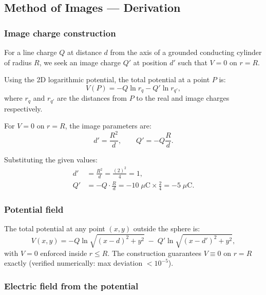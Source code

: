 \documentclass[11pt,a4paper]{article}
\begin{document}
\subsection{Method of Images --- Derivation}

\subsubsection{Image charge construction}

For a line charge $Q$ at distance $d$ from the axis of a grounded conducting cylinder of radius $R$, we seek an image charge $Q'$ at position $d'$ such that $V=0$ on $r=R$.

Using the 2D logarithmic potential, the total potential at a point $P$ is:
\begin{equation}
V(P) = -Q \ln r_q - Q' \ln r_{q'},
\end{equation}
where $r_q$ and $r_{q'}$ are the distances from $P$ to the real and image charges respectively.

For $V=0$ on $r=R$, the image parameters are:
\begin{equation}
\boxed{\;d' = \frac{R^2}{d}, \qquad Q' = -Q\frac{R}{d}.\;}
\label{eq:image}
\end{equation}

Substituting the given values:
\begin{align}
d' &= \frac{R^2}{d} = \frac{(2)^2}{4} = 1, \\[4pt]
Q' &= -Q \cdot \frac{R}{d} = -10\;\mu\text{C} \times \frac{2}{4} = -5\;\mu\text{C}.
\end{align}

\subsubsection{Potential field}

The total potential at any point $(x,y)$ outside the sphere is:
\begin{equation}
V(x,y) = -Q \ln\sqrt{(x-d)^2 + y^2} \;-\; Q' \ln\sqrt{(x-d')^2 + y^2},
\end{equation}
with $V=0$ enforced inside $r \le R$. The construction guarantees $V \equiv 0$ on $r=R$ exactly (verified numerically: max deviation $< 10^{-5}$).

\subsubsection{Electric field from the potential}
\end{document}
